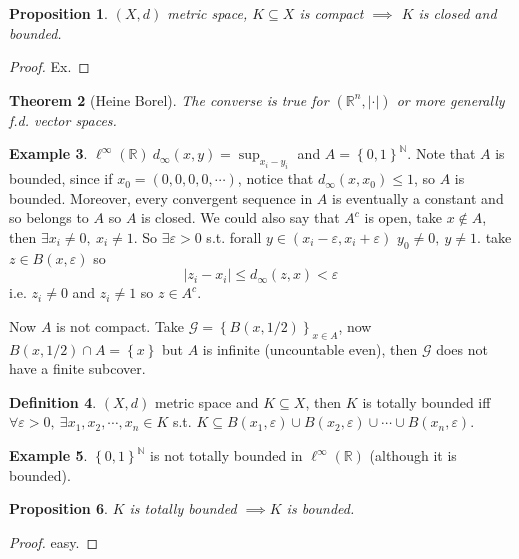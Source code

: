 \documentclass[11pt,a4paper]{article}
\theoremstyle{definition}
\newtheorem{definition}{Definition}[section]
\newtheorem{example}[definition]{Example}
\theoremstyle{plain}
\newtheorem{theorem}[definition]{Theorem}
\newtheorem{proposition}[definition]{Proposition}
\theoremstyle{remark}
\newcommand{\R}{\mathbb{R}}
\newcommand{\N}{\mathbb{N}}
\renewcommand{\set}[1]{\left\{ #1 \right\}}
\newcommand{\abs}[1]{\lvert #1 \rvert}
\newcommand{\1}{\mathbbm{1}}
\begin{document}
\begin{proposition}
    $(X,d)$ metric space, $K \subseteq X$ is compact $\implies$ $K$ is closed and bounded.
\end{proposition}

\begin{proof}
    Ex.
\end{proof}

\begin{theorem}[Heine Borel]
    The converse is true for $(\R^n, \abs{\cdot})$ or more generally f.d. vector spaces.
\end{theorem}

\begin{example}
    $\ell^\infty(\R) \ d_\infty(x, y) = \sup_{x_i - y_i}$ and $A = \set{0,1}^\N$. Note that $A$ is bounded, since if $x_0 = (0,0,0,0,\cdots)$, notice that 
    $d_\infty(x, x_0 ) \le 1$, so $A$ is bounded. Moreover, every convergent sequence in $A$ is eventually a constant and so belongs to $A$ so $A$ is closed. 
    We could also say that $A^c$ is open, take $x \not\in A$, then $\exists x_i \ne 0, \ x_i \ne 1$. So $\exists \varepsilon>0$ s.t. forall $y \in (x_i - \varepsilon, x_i + \varepsilon)$ $y_0 \ne 0, \ y \ne 1$. 
    take $z \in B(x, \varepsilon)$ so 
    $$\abs{z_i - x_i} \le d_\infty(z,x) < \varepsilon$$
    i.e. $z_i \ne 0$ and $z_i \ne 1$ so $z \in A^c$. 

    Now $A$ is not compact. Take $\mathcal{G} = \set{B(x,1/2)}_{x \in A}$, now $B(x,1/2) \cap A = \set{x}$ but $A$ is infinite (uncountable even), then $\mathcal{G}$ does not have a finite subcover. 
\end{example}

\begin{definition}
    $(X, d)$ metric space and $K \subseteq X$, then $K$ is totally bounded iff $\forall \varepsilon > 0, \ \exists x_1, x_2, \cdots, x_n \in K$ s.t. $K \subseteq B(x_1, \varepsilon) \cup B(x_2, \varepsilon) \cup \cdots \cup B(x_n, \varepsilon)$. 
\end{definition}

\begin{example}
    $\set{0,1}^\N$ is not totally bounded in $\ell^\infty(\R)$ (although it is bounded).
\end{example}

\begin{proposition}
    $K$ is totally bounded $\implies K$ is bounded.
\end{proposition}

\begin{proof}
    easy.
\end{proof}
\end{document}
